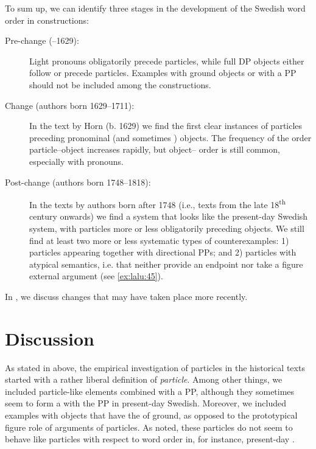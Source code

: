\documentclass[output=paper]{langscibook}
\begin{document}
To sum up, we can identify three stages in the development of the Swedish word order in  constructions:


\begin{description}
\item[Pre-change (–1629):] Light pronouns obligatorily precede particles, while full DP objects either follow or precede particles. Examples with ground objects or with a PP should not be included among the  constructions.
\item[Change (authors born 1629–1711):] In the text by Horn (b. 1629) we find the first clear instances of particles preceding pronominal (and sometimes ) objects. The frequency of the order particle--object increases rapidly, but object– order is still common, especially with pronouns.
\item[Post-change (authors born 1748–1818):] In the texts by authors born after 1748 (i.e., texts from the late 18\textsuperscript{th} century onwards) we find a system that looks like the present-day Swedish system, with particles more or less obligatorily preceding objects. We still find at least two more or less systematic types of counterexamples: 1) particles appearing together with directional PPs; and 2) particles with atypical semantics, i.e. that neither provide an endpoint nor take a figure external argument (see \ref{ex:lalu:45}).
\end{description}

In , we discuss changes that may have taken place more recently.


\section{Discussion}\label{sec:lalu:6}


As stated in  above, the empirical investigation of particles in the historical texts started with a rather liberal definition of \textit{particle}. Among other things, we included particle-like elements combined with a PP, although they sometimes seem to form a  with the PP in present-day Swedish. Moreover, we included examples with objects that have the  of ground, as opposed to the prototypical figure role of arguments of particles. As noted, these particles do not seem to behave like particles with respect to word order in, for instance, present-day .
\end{document}

